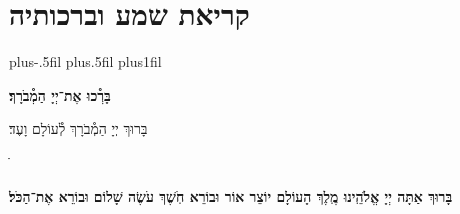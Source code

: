 \documentclass[twoside, openany, parskip=half, 11pt]{book}
\begin{document}
\chapter[שחרית לחול]{קריאת שמע וברכותיה}
\newcommand{\barachu}{
\begin{minipage}{0.8\textwidth}
\leftskip=0pt plus-.5fil
\rightskip=0pt plus.5fil
\parfillskip=0pt plus1fil
\begin{large}

\shatz
\begin{Large}\textbf{בָּרְ֯כוּ אֶת־יְיָ הַמְ֯בֹרָךְ׃}\end{Large}
\end{large}

\vspace{12pt}

\shatzvkahal
בָּרוּךְ יְיָ הַמְ֯בֹרָךְ לְ֯עוֹלָם וָעֶד׃
\end{minipage}
ֺֺ%

%
}


\barachu

\textbf{
בָּרוּךְ אַתָּה יְיָ אֱלֹהֵֽינוּ מֶֽלֶךְ הָעוֹלָם יוֹצֵר אוֹר וּבוֹרֵא חֹֽשֶׁךְ עֹשֶׂה שָׁלוֹם וּבוֹרֵא אֶת־הַכֹּל׃
}

\newcommand{\hameir}{
\firstword{הַמֵּאִיר}
לָאָֽרֶץ וְ֯לַדָּרִים עָלֶֽיהָ בְּ֯רַחֲמִים וּבְטוּבוֹ מְ֯חַדֵּשׁ בְּ֯כׇל־יוֹם תָּמִיד מַעֲשֵׂה בְ֯רֵאשִׁית׃ \source{תהלים קד}מָה־רַבּ֬וּ מַעֲשֶׂ֨יךָ ׀ יְיָ֗ כֻּ֭לָּם בְּ֯חׇכְמָ֣ה עָשִׂ֑יתָ מָלְ֯אָ֥ה הָ֝אָ֗רֶץ קִנְיָנֶֽךָ׃ הַמֶּֽלֶךְ הַמְ֯רוֹמָם לְ֯בַדּוֹ מֵאָז הַמְ֯שֻׁבָּח וְ֯הַמְ֯פֹאָר וְ֯הַמִּתְנַשֵּׂא מִימוֹת עוֹלָם׃ אֱלֹהֵי עוֹלָם בְּ֯רַחֲמֶיךָ הָרַבִּים רַחֵם עָלֵינוּ אֲדוֹן עֻזֵּֽנוּ צוּר מִשְׂגַּבֵּנוּ מָגֵן יִשְׁעֵֽנוּ מִשְׂגָּב בַּעֲדֵֽנוּ׃ אֵ֗ל בָּ֗רוּךְ גְּ֯֗דוֹל דֵּ֗עָה הֵ֗כִין וּ֗פָעַל זׇ֗הֳרֵי חַ֗מָּה ט֗וֹב יָ֗צַר כָּ֗בוֹד לִ֗שְׁמוֹ מְ֯֗אוֹרוֹת נָ֗תַן סְ֯֗בִיבוֹת עֻ֗זּוֹ פִּ֗נּוֹת צְ֯֗בָאָיו קְ֯֗דוֹשִׁים ר֗וֹמְ֯מֵי שַׁ֗דַּי תָּ֗מִיד מְ֯סַפְּ֯רִים כְּ֯בוֹד־אֵל וּקְדֻשָׁתוֹ׃ תִּתְבָּרַךְ יְיָ אֱלֹהֵֽינוּ עַל־שֶׁבַח מַעֲשֵׂי יָדֶֽיךָ וְ֯עַל־מְ֯אֽוֹרֵי אוֹר שֶׁעָשִֽׂיתָ יְ֯פָאֲרֽוּךָ סֶּֽלָה׃
}
\end{document}
